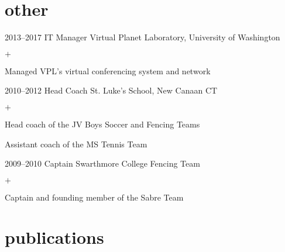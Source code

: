 \documentclass[]{luger-cv} %
\begin{document}

\section{other}

\begin{entrylist}


\entry
{2013--2017}
{IT Manager}
{Virtual Planet Laboratory, University of Washington}
{%
\vspace{-1em}
\begin{list}{$+$}{\cvlist}
\item Managed VPL's virtual conferencing system and network
\end{list}
}


\entry
{2010--2012}
{Head Coach}
{St. Luke's School, New Canaan CT}
{%
\vspace{-1em}
\begin{list}{$+$}{\cvlist}
\item Head coach of the JV Boys Soccer and Fencing Teams
\item Assistant coach of the MS Tennis Team
\end{list}
}


\entry
{2009--2010}
{Captain}
{Swarthmore College Fencing Team}
{%
\vspace{-1em}
\begin{list}{$+$}{\cvlist}
\item Captain and founding member of the Sabre Team
\end{list}
}


\end{entrylist}


\ifdefined\withpubs
    \section{publications}
    \begin{list}{}{\pubslist}
        
    \end{list}
\fi
\end{document}
